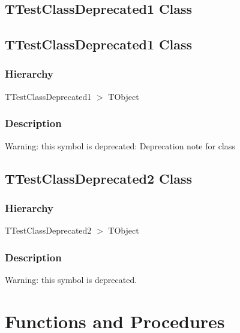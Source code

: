 \documentclass{report}
\newif\ifpdf
\begin{document}
\subsection*{\large{\textbf{TTestClassDeprecated1 Class}}\normalsize\hspace{1ex}\hrulefill}
\else
\subsection*{TTestClassDeprecated1 Class}
\fi
\label{ok_deprecated_directive_note.TTestClassDeprecated1}
\subsubsection*{\large{\textbf{Hierarchy}}\normalsize\hspace{1ex}\hfill}
TTestClassDeprecated1 {$>$} TObject
\subsubsection*{\large{\textbf{Description}}\normalsize\hspace{1ex}\hfill}
Warning: this symbol is deprecated: Deprecation note for class

\ifpdf
\subsection*{\large{\textbf{TTestClassDeprecated2 Class}}\normalsize\hspace{1ex}\hrulefill}
\else
\subsection*{TTestClassDeprecated2 Class}
\fi
\label{ok_deprecated_directive_note.TTestClassDeprecated2}
\subsubsection*{\large{\textbf{Hierarchy}}\normalsize\hspace{1ex}\hfill}
TTestClassDeprecated2 {$>$} TObject
\subsubsection*{\large{\textbf{Description}}\normalsize\hspace{1ex}\hfill}
Warning: this symbol is deprecated.

\section{Functions and Procedures}
\ifpdf
\end{document}
